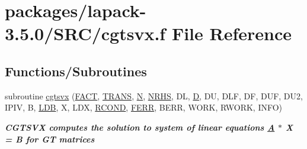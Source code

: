 \hypertarget{cgtsvx_8f}{}\section{packages/lapack-\/3.5.0/\+S\+R\+C/cgtsvx.f File Reference}
\label{cgtsvx_8f}
\subsection*{Functions/\+Subroutines}
\begin{DoxyCompactItemize}
\item 
subroutine \hyperlink{group__complexGTsolve_ga52aedc3d07eae490ca91df3dec897e8c}{cgtsvx} (\hyperlink{superlu__enum__consts_8h_af00a42ecad444bbda75cde1b64bd7e72a1b6692b56d378abb85bd49063721d034}{F\+A\+C\+T}, \hyperlink{superlu__enum__consts_8h_a0c4e17b2d5cea33f9991ccc6a6678d62a1f61e3015bfe0f0c2c3fda4c5a0cdf58}{T\+R\+A\+N\+S}, \hyperlink{polmisc_8c_a0240ac851181b84ac374872dc5434ee4}{N}, \hyperlink{example__user_8c_aa0138da002ce2a90360df2f521eb3198}{N\+R\+H\+S}, D\+L, \hyperlink{odrpack_8h_a7dae6ea403d00f3687f24a874e67d139}{D}, D\+U, D\+L\+F, D\+F, D\+U\+F, D\+U2, I\+P\+I\+V, B, \hyperlink{example__user_8c_a50e90a7104df172b5a89a06c47fcca04}{L\+D\+B}, X, L\+D\+X, \hyperlink{superlu__enum__consts_8h_af00a42ecad444bbda75cde1b64bd7e72a9b5c151728d8512307565994c89919d5}{R\+C\+O\+N\+D}, \hyperlink{superlu__enum__consts_8h_af00a42ecad444bbda75cde1b64bd7e72a78fd14d7abebae04095cfbe02928f153}{F\+E\+R\+R}, B\+E\+R\+R, W\+O\+R\+K, R\+W\+O\+R\+K, I\+N\+F\+O)
\begin{DoxyCompactList}\small\item\em {\bfseries  C\+G\+T\+S\+V\+X computes the solution to system of linear equations \hyperlink{classA}{A} $\ast$ X = B for G\+T matrices {\bfseries  }}\end{DoxyCompactList}\end{DoxyCompactItemize}

